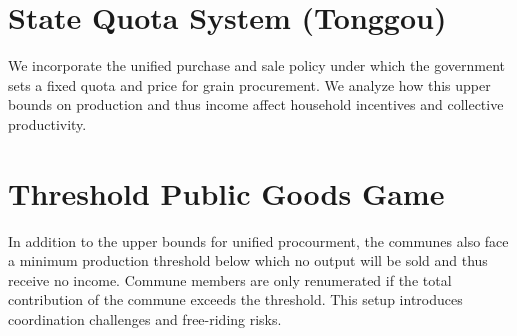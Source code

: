\documentclass[12pt]{article}
\begin{document}
\section{State Quota System (Tonggou)}
We incorporate the unified purchase and sale policy under which the government sets a fixed quota and price for grain procurement. We analyze how this upper bounds on production and thus income affect household incentives and collective productivity.

\section{Threshold Public Goods Game}
In addition to the upper bounds for unified procourment, the communes also face a minimum production threshold below which no output will be sold and thus receive no income. Commune members are only renumerated if the total contribution of the commune exceeds the threshold. This setup introduces coordination challenges and free-riding risks.
\end{document}
